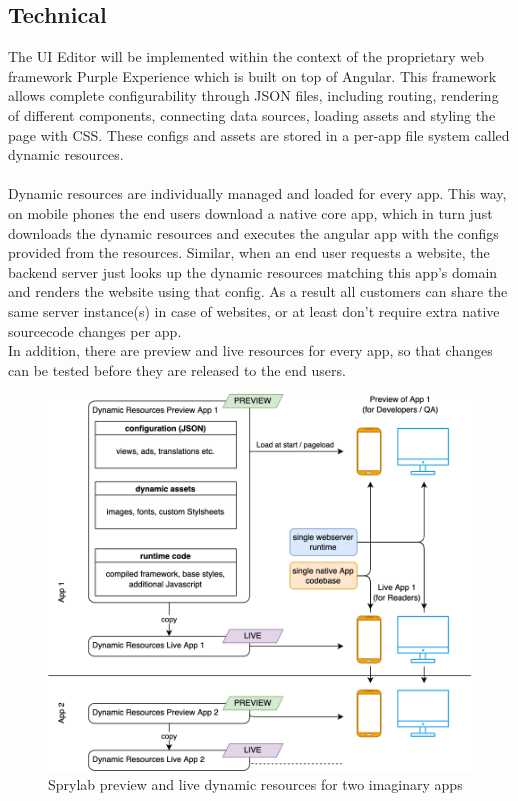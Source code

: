 \subsection{Technical}

The UI Editor will be implemented within the context of the proprietary web framework Purple Experience which is built on top of Angular.
This framework allows complete configurability through JSON files, including routing, rendering of different components, connecting data sources, loading assets and styling the page with CSS.
These configs and assets are stored in a per-app file system called \label{def:DynamicResources} dynamic resources.
\\\\
Dynamic resources are individually managed and loaded for every app. This way, on mobile phones the end users download a native core app, which in turn just downloads the dynamic resources and executes the angular app with the configs provided from the resources.
Similar, when an end user requests a website, the backend server just looks up the dynamic resources matching this app's domain and renders the website using that config.
As a result all customers can share the same server instance(s) in case of websites, or at least don't require extra native sourcecode changes per app.
\\
In addition, there are preview and live resources for every app, so that changes can be tested before they are released to the end users.
\begin{figure}[h!]
  \includegraphics[width=\linewidth]{pics/experience_resources.drawio.png}
  \caption{Sprylab preview and live dynamic resources for two imaginary apps}
  \label{fig:dynres}
\end{figure}
